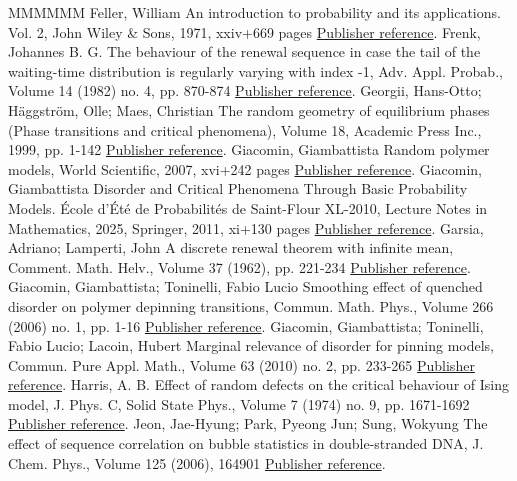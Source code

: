 \documentclass[11pt]{article}
\theoremstyle{definition}
\numberwithin{equation}{section}
\numberwithin{figure}{section}
\numberwithin{table}{section}
\begin{document}
\begin{thebibliography}{MMMMMM}
 Feller, William An introduction to probability and its applications. Vol. 2, John Wiley \& Sons, 1971, xxiv+669 pages \href{https://ahl.centre-mersenne.org/item/AHL_2019__2__281_0/#Feller71}{Publisher reference}.
 Frenk, Johannes B. G. The behaviour of the renewal sequence in case the tail of the waiting-time distribution is regularly varying with index -1, Adv. Appl. Probab., Volume 14 (1982) no. 4, pp. 870-874 \href{https://ahl.centre-mersenne.org/item/AHL_2019__2__281_0/#Fr82}{Publisher reference}.
 Georgii, Hans-Otto; Häggström, Olle; Maes, Christian The random geometry of equilibrium phases (Phase transitions and critical phenomena), Volume 18, Academic Press Inc., 1999, pp. 1-142 \href{https://ahl.centre-mersenne.org/item/AHL_2019__2__281_0/#GHM1999}{Publisher reference}.
 Giacomin, Giambattista Random polymer models, World Scientific, 2007, xvi+242 pages \href{https://ahl.centre-mersenne.org/item/AHL_2019__2__281_0/#Gi2007}{Publisher reference}.
 Giacomin, Giambattista Disorder and Critical Phenomena Through Basic Probability Models. École d’Été de Probabilités de Saint-Flour XL-2010, Lecture Notes in Mathematics, 2025, Springer, 2011, xi+130 pages \href{https://ahl.centre-mersenne.org/item/AHL_2019__2__281_0/#Gi2011}{Publisher reference}.
 Garsia, Adriano; Lamperti, John A discrete renewal theorem with infinite mean, Comment. Math. Helv., Volume 37 (1962), pp. 221-234 \href{https://ahl.centre-mersenne.org/item/AHL_2019__2__281_0/#GL63}{Publisher reference}.
 Giacomin, Giambattista; Toninelli, Fabio Lucio Smoothing effect of quenched disorder on polymer depinning transitions, Commun. Math. Phys., Volume 266 (2006) no. 1, pp. 1-16 \href{https://ahl.centre-mersenne.org/item/AHL_2019__2__281_0/#GiT2006}{Publisher reference}.
 Giacomin, Giambattista; Toninelli, Fabio Lucio; Lacoin, Hubert Marginal relevance of disorder for pinning models, Commun. Pure Appl. Math., Volume 63 (2010) no. 2, pp. 233-265 \href{https://ahl.centre-mersenne.org/item/AHL_2019__2__281_0/#GTL09}{Publisher reference}.
 Harris, A. B. Effect of random defects on the critical behaviour of Ising model, J. Phys. C, Solid State Phys., Volume 7 (1974) no. 9, pp. 1671-1692 \href{https://ahl.centre-mersenne.org/item/AHL_2019__2__281_0/#H74}{Publisher reference}.
 Jeon, Jae-Hyung; Park, Pyeong Jun; Sung, Wokyung The effect of sequence correlation on bubble statistics in double-stranded DNA, J. Chem. Phys., Volume 125 (2006), 164901 \href{https://ahl.centre-mersenne.org/item/AHL_2019__2__281_0/#JPS06}{Publisher reference}.

\end{thebibliography}
\end{document}
